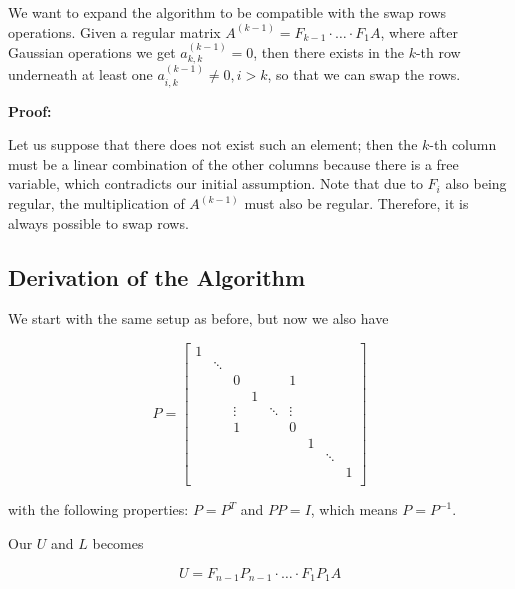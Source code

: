 We want to expand the algorithm to be compatible with the swap rows operations. Given a regular matrix 
\(A^{(k - 1)} = F_{k - 1} \cdot \dots \cdot F_1 A\), where after Gaussian operations we get \(a_{k,k}^{(k - 1)} = 0\), then 
there exists in the \(k\)-th row underneath at least one \(a_{i,k}^{(k - 1)} \ne 0, i > k\), so that we can swap the rows.

\textbf{Proof:}

Let us suppose that there does not exist such an element; then the \(k\)-th column must be a linear combination of the other 
columns because there is a free variable, which contradicts our initial assumption. Note that due to \(F_{i}\) also being regular, the multiplication 
of \(A^{(k - 1)}\) must also be regular. Therefore, it is always possible to swap rows.

\QED

\subsection{Derivation of the Algorithm}

We start with the same setup as before, but now we also have 

\[
    P = 
    \begin{bmatrix}
        1 &        &         &   &            &   &   &        & \\
          & \ddots &         &   &            &   &   &        & \\
          &        & 0       &   &            & 1  &   &        & \\
          &        &         & 1 &            &  &   &        & \\
          &        & \vdots  &   &  \ddots    & \vdots &   &        & \\
          &        &  1      &   &            & 0 &   &        & \\
          &        &         &   &            &   & 1 &        & \\
          &        &         &   &            &   &   & \ddots & \\
          &        &         &   &            &   &   &        &  1\\
    \end{bmatrix}
\]

with the following properties: \(P = P^T\) and \(PP = I\), which means \(P = P^{-1}\).

Our \(U\) and \(L\) becomes 

\[
    U = F_{n - 1} P_{n - 1} \cdot \dots \cdot F_1 P_1 A
\]

